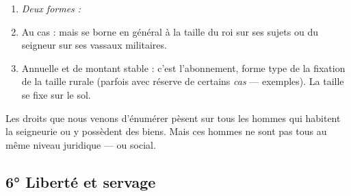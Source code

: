 \documentclass[french,twoside]{book} %
\newlength{\listmod}
\newcommand{\listhead}[1]{\hspace{-1\listmod}\emph{#1}}
\begin{document}
\begin{enumerate}[itemsep=0pt,]
\item[]\listhead{Deux formes :}
\item Au cas : mais se borne en général à la taille du roi sur ses sujets ou du seigneur sur ses vassaux militaires.
\item Annuelle et de montant stable : c’est l’abonnement, forme type de la fixation de la taille rurale (parfois avec réserve de certains \emph{cas} — exemples). La taille se fixe sur le sol.

\end{enumerate}\noindent Les droits que nous venons d’énumérer pèsent sur tous les hommes qui habitent la seigneurie ou y possèdent des biens. Mais ces hommes ne sont pas tous au même niveau juridique — ou social.  
\label{p59}
\subsection[6° Liberté et servage]{6° Liberté et servage}
\end{document}
